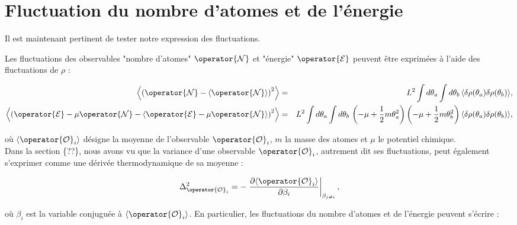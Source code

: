 


\section{Fluctuation du nombre d'atomes et de l'énergie}




Il est maintenant pertinent de tester notre expression des fluctuations.

Les fluctuations des observables "nombre d’atomes" \( \operator{\mathcal{N}} \) et "énergie" \( \operator{\mathcal{E}} \) peuvent être exprimées à l’aide des fluctuations de \( \rho \) :

\begin{eqnarray*}
    \left \langle  \left( \operator{\mathcal{N}} - \langle \operator{\mathcal{N}} \rangle \right)^2 \right \rangle &=& L^2 \int d\theta_a \int d\theta_b \, \langle \delta \rho(\theta_a) \delta \rho(\theta_b) \rangle, \\
    \left \langle \left( \operator{\mathcal{E}} - \mu \operator{\mathcal{N}} - \langle \operator{\mathcal{E}} - \mu \operator{\mathcal{N}} \rangle \right)^2 \right \rangle &=& L^2 \int d\theta_a \int d\theta_b \, \left( -\mu + \frac{1}{2} m \theta_a^2 \right) \left( -\mu + \frac{1}{2} m \theta_b^2 \right) \langle \delta \rho(\theta_a) \delta \rho(\theta_b) \rangle,
\end{eqnarray*}

où \( \langle \operator{\mathcal{O}}_i \rangle \) désigne la moyenne de l’observable \( \operator{\mathcal{O}}_i \), \( m \) la masse des atomes et \( \mu \) le potentiel chimique.\\

Dans la section \{??\}, nous avons vu que la variance d’une observable \( \operator{\mathcal{O}}_i \), autrement dit ses fluctuations, peut également s’exprimer comme une dérivée thermodynamique de sa moyenne :

\begin{eqnarray*}
    \Delta_{\operator{\mathcal{O}}_i}^2 = - \left. \frac{\partial \langle \operator{\mathcal{O}}_i \rangle}{\partial \beta_i} \right|_{\beta_{j \neq i}},
\end{eqnarray*}

où \( \beta_i \) est la variable conjuguée à \( \langle \operator{\mathcal{O}}_i \rangle \). En particulier, les fluctuations du nombre d’atomes et de l’énergie peuvent s’écrire :

